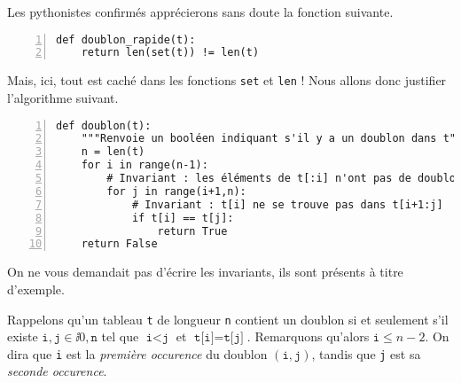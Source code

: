 \exer{}
\setcounter{numques}{0}

Les pythonistes confirmés apprécierons sans doute la fonction suivante. 
\begin{Verbatim}[gobble=0,numbers=left]
def doublon_rapide(t):
    return len(set(t)) != len(t)
\end{Verbatim}
Mais, ici, tout est caché dans les fonctions \texttt{set} et \texttt{len} ! Nous allons donc justifier l'algorithme suivant. 
\begin{Verbatim}[gobble=0,numbers=left]
def doublon(t):
    """Renvoie un booléen indiquant s'il y a un doublon dans t"""
    n = len(t)
    for i in range(n-1):
        # Invariant : les éléments de t[:i] n'ont pas de doublon
        for j in range(i+1,n):
            # Invariant : t[i] ne se trouve pas dans t[i+1:j]
            if t[i] == t[j]:
                return True
    return False
\end{Verbatim}
\begin{rem}
  On ne vous demandait pas d'écrire les invariants, ils sont présents à titre d'exemple. 
\end{rem}
Rappelons qu'un tableau \texttt{t} de longueur \texttt{n} contient un doublon si et seulement s'il existe $\texttt{i},\texttt{j} \in \ii{0,\texttt{n}}$ tel que $\texttt{i}<\texttt{j}$ et $\texttt{t[i]} = \texttt{t[j]}$. 
Remarquons qu'alors $\texttt{i} \leq n-2$. On dira que \texttt{i} est la \emph{première occurence} du doublon $(\texttt{i},\texttt{j})$, tandis que \texttt{j} est sa \emph{seconde occurence}.
